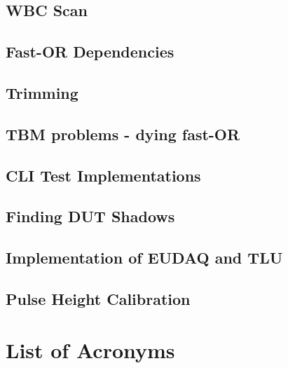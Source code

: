 \documentclass[british,11pt,a4paper]{memoir}
\begin{document}
\section{WBC Scan}
\section{Fast-OR Dependencies}
\section{Trimming}
\section{\ac{TBM} problems - dying fast-OR}
\section{\ac{CLI} Test Implementations}
\section{Finding \ac{DUT} Shadows}
\section{Implementation of EUDAQ and \ac{TLU} }
\section{Pulse Height Calibration}
\chapter*{List of Acronyms}


% 
\end{document}
